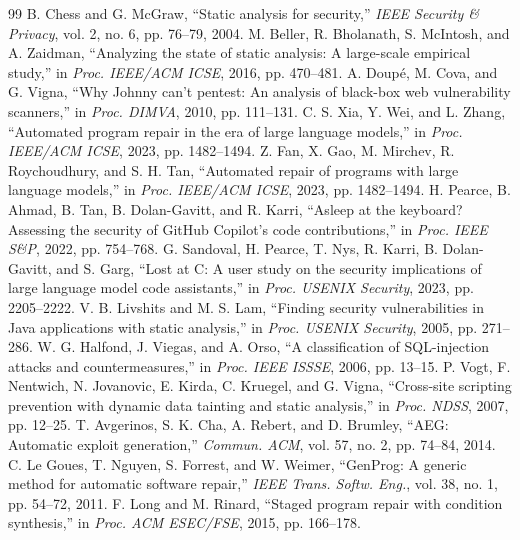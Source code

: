 \documentclass[journal,twoside]{IEEEtran}
\begin{document}
\balance
\begin{thebibliography}{99}
 B. Chess and G. McGraw, ``Static analysis for security,'' \emph{IEEE Security \& Privacy}, vol. 2, no. 6, pp. 76--79, 2004.
 M. Beller, R. Bholanath, S. McIntosh, and A. Zaidman, ``Analyzing the state of static analysis: A large-scale empirical study,'' in \emph{Proc. IEEE/ACM ICSE}, 2016, pp. 470--481.
 A. Doup{\'e}, M. Cova, and G. Vigna, ``Why Johnny can't pentest: An analysis of black-box web vulnerability scanners,'' in \emph{Proc. DIMVA}, 2010, pp. 111--131.
 C. S. Xia, Y. Wei, and L. Zhang, ``Automated program repair in the era of large language models,'' in \emph{Proc. IEEE/ACM ICSE}, 2023, pp. 1482--1494.
 Z. Fan, X. Gao, M. Mirchev, R. Roychoudhury, and S. H. Tan, ``Automated repair of programs with large language models,'' in \emph{Proc. IEEE/ACM ICSE}, 2023, pp. 1482--1494.
 H. Pearce, B. Ahmad, B. Tan, B. Dolan-Gavitt, and R. Karri, ``Asleep at the keyboard? Assessing the security of GitHub Copilot's code contributions,'' in \emph{Proc. IEEE S\&P}, 2022, pp. 754--768.
 G. Sandoval, H. Pearce, T. Nys, R. Karri, B. Dolan-Gavitt, and S. Garg, ``Lost at C: A user study on the security implications of large language model code assistants,'' in \emph{Proc. USENIX Security}, 2023, pp. 2205--2222.
 V. B. Livshits and M. S. Lam, ``Finding security vulnerabilities in Java applications with static analysis,'' in \emph{Proc. USENIX Security}, 2005, pp. 271--286.
 W. G. Halfond, J. Viegas, and A. Orso, ``A classification of SQL-injection attacks and countermeasures,'' in \emph{Proc. IEEE ISSSE}, 2006, pp. 13--15.
 P. Vogt, F. Nentwich, N. Jovanovic, E. Kirda, C. Kruegel, and G. Vigna, ``Cross-site scripting prevention with dynamic data tainting and static analysis,'' in \emph{Proc. NDSS}, 2007, pp. 12--25.
 T. Avgerinos, S. K. Cha, A. Rebert, and D. Brumley, ``AEG: Automatic exploit generation,'' \emph{Commun. ACM}, vol. 57, no. 2, pp. 74--84, 2014.
 C. Le Goues, T. Nguyen, S. Forrest, and W. Weimer, ``GenProg: A generic method for automatic software repair,'' \emph{IEEE Trans. Softw. Eng.}, vol. 38, no. 1, pp. 54--72, 2011.
 F. Long and M. Rinard, ``Staged program repair with condition synthesis,'' in \emph{Proc. ACM ESEC/FSE}, 2015, pp. 166--178.

\end{thebibliography}
\end{document}
